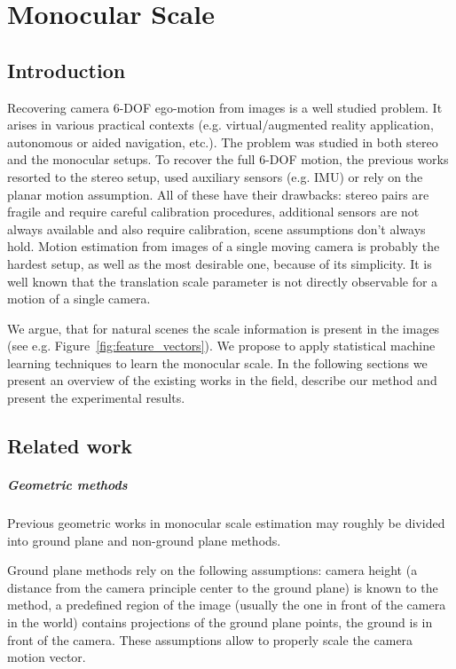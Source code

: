 \chapter{Monocular Scale}

\section{Introduction}

Recovering camera 6-DOF ego-motion from images is a well studied
problem. It arises in various practical contexts
(e.g. virtual/augmented reality application, autonomous or aided
navigation, etc.).  The problem was studied in both stereo and the
monocular setups.  To recover the full 6-DOF motion, the previous
works resorted to the stereo setup, used auxiliary sensors (e.g. IMU)
or rely on the planar motion assumption.  All of these have their
drawbacks: stereo pairs are fragile and require careful calibration
procedures, additional sensors are not always available and also
require calibration, scene assumptions don't always hold.  Motion
estimation from images of a single moving camera is probably the
hardest setup, as well as the most desirable one, because of its
simplicity.  It is well known that the translation scale parameter is
not directly observable for a motion of a single camera.

We argue, that for natural scenes the scale information is present in
the images (see e.g. Figure~\ref{fig:feature_vectors}).  We propose to
apply statistical machine learning techniques to learn the monocular
scale.  In the following sections we present an overview of the
existing works in the field, describe our method and present the
experimental results.

\section{Related work}
\paragraph{Geometric methods} Previous geometric works in monocular
scale estimation may roughly be divided into ground plane and
non-ground plane methods.

Ground plane methods rely on the following assumptions: camera height
(a distance from the camera principle center to the ground plane) is
known to the method, a predefined region of the image (usually the one
in front of the camera in the world) contains projections of the
ground plane points, the ground is in front of the camera.  These
assumptions allow to properly scale the camera motion vector.


